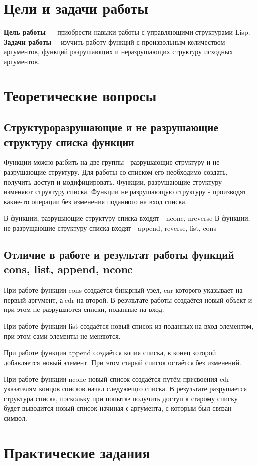 \chapter{Цели и задачи работы}
\textbf{Цель работы} --- приобрести навыки работы с управляющими структурами Lisp.
\textbf{Задачи работы} ---изучить работу функций с произвольным количеством аргументов, функций
разрушающих и неразрушающих структуру исходных аргументов.

\chapter{Теоретические вопросы}
\section{Структуроразрушающие и не разрушающие структуру списка функции}
Функции можно разбить на две группы - разрушающие структуру и не разрушающие структуру. Для работы со списком его необходимо создать, получить доступ и модифицировать. Функции, разрушающие структуру - изменяют структуру списка. Функции не разрушающую структуру - производят какие-то операции без изменения поданного на вход списка.

В функции, разрушающие структуру списка входят - nconc, nreverse
В функции, не разрущающие структуру списка входят - append, reverse, list, cons
\section{Отличие в работе и результат работы функций cons, list, append, nconc}
При работе функции cons создаётся бинарный узел, car которого указывает на первый аргумент, а cdr на второй. В результате работы создаётся новый объект и при этом не разрушаются списки, поданные на вход. 

При работе функции list создаётся новый список из поданных на вход элементом, при этом сами элементы не меняются.

При работе функции append создаётся копия списка, в конец которой добавляется новый элемент. При этом старый список остаётся без изменений.

При работе функции nconc новый список создаётся путём присвоения cdr указателям концов списков начал следуюещго списка. В результате разрушается структура списка, поскольку при попытке получить доступ к старому списку будет выводится новый список начиная с аргумента, с которым был связан символ.

\chapter{Практические задания}
